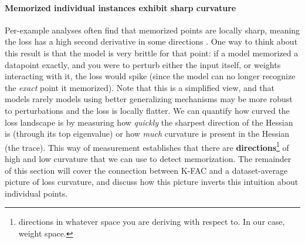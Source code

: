 \documentclass{article} %
\begin{document}
\paragraph{Memorized individual instances exhibit sharp curvature} Per-example analyses often find that memorized points are locally sharp, meaning the loss has a high second derivative in some directions \citep{ravikumar2024unveiling, garg2024memorization, hochreiter1997flat, foretsharpness}. One way to think about this result is that the model is very brittle for that point: if a model memorized a datapoint exactly, and you were to perturb either the input itself, or weights interacting with it, the loss would spike (since the model can no longer recognize the \textit{exact} point it memorized). Note that this is a simplified view, and that models rarely  models using better generalizing mechanisms may be more robust to perturbations and the loss is locally flatter. We can quantify how curved the loss landscape is by measuring how \textit{quickly} the sharpest direction of the Hessian is (through its top eigenvalue) or how \textit{much} curvature is present in the Hessian (the trace). This way of measurement establishes that there are \textbf{directions}\footnote{directions in whatever space you are deriving with respect to. In our case, weight space.} of high and low curvature that we can use to detect memorization. The remainder of this section will cover the connection between K-FAC and a dataset-average picture of loss curvature, and discuss how this picture inverts this intuition about individual points.
\end{document}

